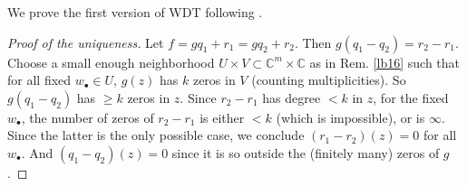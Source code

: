 \documentclass[12pt,b5paper,notitlepage]{report}
\theoremstyle{definition}
\theoremstyle{plain}
\newcommand{\blt}{\bullet}
\newcommand{\Cbb}{\mathbb C}
\numberwithin{equation}{section}
\begin{document}
We prove the first version of WDT following \cite{GR}.
\begin{proof}[Proof of the uniqueness]
Let $f=gq_1+r_1=gq_2+r_2$. Then $g(q_1-q_2)=r_2-r_1$. Choose a small enough neighborhood $U\times V\subset\Cbb^m\times\Cbb$ as in Rem. \ref{lb16} such that for all fixed $w_\blt\in U$, $g(z)$ has $k$ zeros in $V$ (counting multiplicities). So $g(q_1-q_2)$ has $\geq k$ zeros in $z$. Since $r_2-r_1$ has degree $<k$ in $z$, for the fixed $w_\blt$, the number of zeros of $r_2-r_1$ is either $<k$ (which is impossible), or is $\infty$. Since the latter is the only possible case, we conclude $(r_1-r_2)(z)=0$ for all $w_\blt$. And $(q_1-q_2)(z)=0$  since it is so outside the (finitely many) zeros of $g$.
\end{proof}
\end{document}
